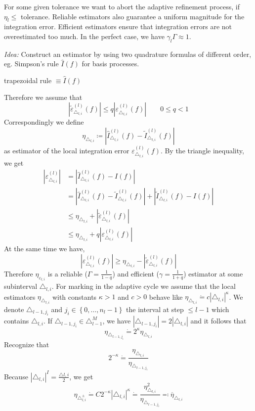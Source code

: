 \documentclass[a4paper]{article}
\numberwithin{lecref}{section}
\theoremstyle{break}
\newcommand{\Abs}[1]{\left|#1\right|}
\newcommand{\Set}[1]{\left\{#1\right\}}
\begin{document}
For some given tolerance we want to abort the adaptive refinement process, if $\eta_{l} \leq$ tolerance. Reliable estimators also guarantee a uniform magnitude for the integration error. Efficient estimators ensure that integration errors are not overestimated too much. In the perfect case, we have $\gamma_l \Gamma \approx 1$.

\emph{Idea:} Construct an estimator by using two quadrature formulas of different order, eg. Simpson's rule $\hat{I}(f)$ for basis processes.
\begin{center}
  trapezoidal rule $\equiv \hat{I}(f)$
\end{center}

Therefore we assume that
\[ \Abs{\tilde\varepsilon_{\triangle_{l,i}}^{(l)}(f)} \leq q \Abs{\varepsilon_{\triangle_{l,i}}^{(l)}(f)} \qquad 0 \leq q < 1 \]
Correspondingly we define
\[ \eta_{\triangle_{l,i}} \coloneqq \Abs{\hat{I}_{\triangle_{l,i}}^{(l)}(f) - \tilde I_{\triangle_{l,i}}^{(l)}(f)} \]
as estimator of the local integration error $\varepsilon_{\triangle_{l,i}}^{(l)}(f)$. By the triangle inequality, we get
\begin{align*}
  \Abs{\varepsilon_{\triangle_{l,i}}^{(l)}}
    &= \Abs{\hat I_{\triangle_{l,i}}^{(l)}(f) - I(f)} \\
    &= \Abs{\hat I_{\triangle_{l,i}}^{(l)}(f) - \tilde I_{\triangle_{l,i}}^{(l)}(f)} + \Abs{\tilde I_{\triangle_{l,i}}^{(l)}(f) - I(f)} \\
    &\leq \eta_{\triangle_{l,i}} + \Abs{\tilde \varepsilon_{\triangle_{l,i}}^{(l)}(f)} \\
    &\leq \eta_{\triangle_{l,i}} + q \Abs{\varepsilon_{\triangle_{l,i}}^{(l)}(f)}
\end{align*}
At the same time we have,
\[ \Abs{\varepsilon_{\triangle_{l,i}}^{(l)}(f)} \geq \eta_{\triangle_{l,i}} - \Abs{\tilde\varepsilon_{\triangle_{l,i}}^{(l)}(f)} \]
Therefore $\eta_{\varepsilon_{l,i}}$ is a reliable ($\Gamma = \frac1{1-q}$) and efficient ($\gamma = \frac1{1 + q}$) estimator at some subinterval $\triangle_{l,i}$. For marking in the adaptive cycle we assume that the local estimators $\eta_{\triangle_{l,i}}$ with constants $\kappa > 1$ and $c > 0$ behave like $\eta_{\triangle_{l,i}} \dot{=} c\Abs{\triangle_{l,i}}^\kappa$. We denote $\triangle_{l-1,j_i}$ and $j_i \in \Set{0, \dots, n_l-1}$ the interval at step $\leq l-1$ which contains $\triangle_{l,i}$. If $\triangle_{l-1,j_i} \in \triangle_{l-1}^M$, we have $\Abs{\triangle_{l-1,j_i}} = 2 \Abs{\triangle_{l,i}}$ and it follows that 
\[ \eta_{\triangle_{l-1,j_i}} \dot{=} 2^\kappa \eta_{\triangle_{l,i}} \]
Recognize that
\[ 2^{-\kappa} \dot{=} \frac{\eta_{\triangle_{l,i}}}{\eta_{\triangle_{l-1,j_i}}} \]
Because $\Abs{\triangle_{l,i}}^{I} = \frac{\triangle{l,i}}{2}$, we get
\[ \eta_{\triangle_{l,i}^{\pm}} \dot{=} C 2^{-\kappa} \Abs{\triangle_{l,i}}^\kappa \dot{=} \frac{\eta_{\triangle_{l,i}}^2}{\eta_{\triangle_{l-1,j_i}}} \eqqcolon \overline{\eta}_{\triangle_{l,i}} \]
\end{document}
